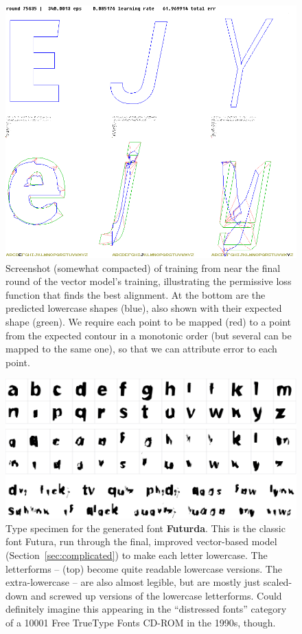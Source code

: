 \documentclass[twocolumn]{article}
\begin{document}
\begin{figure}[ht]
\centering
  \includegraphics[width=0.95 \linewidth]{trainingrotate}
\caption{ Screenshot (somewhat compacted) of training from near the
  final round of the vector model's training, illustrating the
  permissive loss function that finds the best alignment. At the bottom are
  the predicted lowercase shapes (blue), also shown with their
  expected shape (green). We require each point to be mapped (red)
  to a point from the expected contour in a monotonic order (but
  several can be mapped to the same one), so that we can attribute
  error to each point.
} \label{fig:trainingrotate}
\end{figure}


\begin{figure}[tp]
\centering
  \includegraphics[width=0.95 \linewidth]{futurda}
\caption{ Type specimen for the generated font {\bf Futurda}. This is
  the classic font Futura, run through the final, improved
  vector-based model (Section~\ref{sec:complicated}) to make each
  letter lowercase. The letterforms --
  (top) become quite readable lowercase versions. The extra-lowercase
  -- are also almost legible, but are
  mostly just scaled-down and screwed up versions of the lowercase
  letterforms. Could definitely imagine this appearing in the
  ``distressed fonts'' category of a 10001 Free TrueType Fonts CD-ROM
  in the 1990s, though.
} \label{fig:futurda}
\end{figure}
\end{document}
